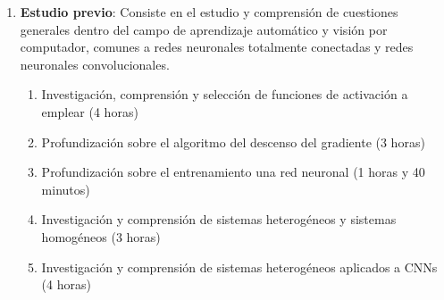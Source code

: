 \begin{enumerate}[label=\textbullet]
	\item \textbf{Estudio previo}: Consiste en el estudio y comprensión de cuestiones generales dentro del campo de aprendizaje automático y visión por computador, comunes a redes neuronales totalmente conectadas y redes neuronales convolucionales.
	\begin{enumerate}[label=\textbullet]
		\item Investigación, comprensión y selección de funciones de activación a emplear (4 horas)
		\item Profundización sobre el algoritmo del descenso del gradiente (3 horas)
		\item Profundización sobre el entrenamiento una red neuronal (1 horas y 40 minutos)
		\item Investigación y comprensión de sistemas heterogéneos y sistemas homogéneos (3 horas)
		\item Investigación y comprensión de sistemas heterogéneos aplicados a CNNs (4 horas)
	\end{enumerate}
	

\end{enumerate}
